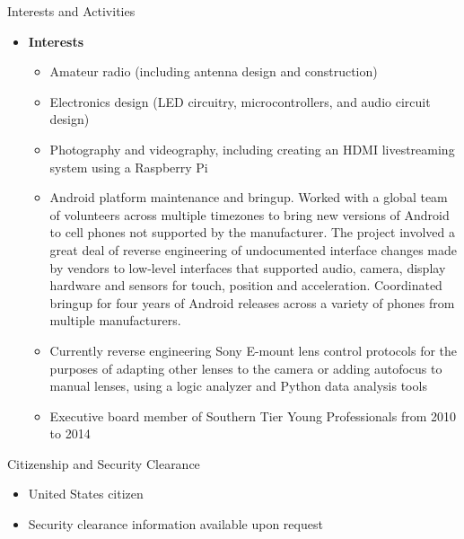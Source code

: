 \documentclass[10pt,oneside]{article}
\newenvironment{ressection}[1]{
	\vspace{4pt}
	{\Large#1}
	\begin{itemize}
	\vspace{3pt}
}{
	\end{itemize}
}
\newcommand{\resitem}[1]{
	\vspace{-4pt}
	\item \begin{flushleft} #1 \end{flushleft}
}
\newcommand{\ressubitem}[1]{
	\vspace{-1pt}
	\item \begin{flushleft} #1 \end{flushleft}
}
\newenvironment{reslist}[1]{
	\resitem{\textbf{#1}}
	\vspace{-5pt}
	\begin{itemize}
}{
	\end{itemize}
}
\newenvironment{ressection}[1]{
	\vspace{4pt}
	{\fontfamily{phv}\selectfont\Large#1}
	\begin{itemize}
	\vspace{3pt}
}{
	\end{itemize}
}
\newcommand{\resitem}[1]{
	\vspace{-4pt}
	\item \begin{flushleft} #1 \end{flushleft}
}
\newcommand{\ressubitem}[1]{
	\vspace{-1pt}
	\item \begin{flushleft} #1 \end{flushleft}
}
\newenvironment{reslist}[1]{
	\resitem{\textbf{#1}}
	\vspace{-5pt}
	\begin{itemize}
}{
	\end{itemize}
}
\begin{document}
\begin{ressection}{Interests and Activities}
	\begin{reslist}{Interests}
		\ressubitem{Amateur radio (including antenna design and construction)}
		\ressubitem{Electronics design (LED circuitry, microcontrollers, and audio circuit design)}
		\ressubitem{Photography and videography, including creating an HDMI livestreaming system using a Raspberry Pi}
	        \ressubitem{Android platform maintenance and bringup.  Worked with a global team of volunteers across multiple timezones to bring new versions of Android to cell phones not supported by the manufacturer.  The project involved a great deal of reverse engineering of undocumented interface changes made by vendors to low-level interfaces that supported audio, camera, display hardware and sensors for touch, position and acceleration.  Coordinated bringup for four years of Android releases across a variety of phones from multiple manufacturers.}
                \ressubitem{Currently reverse engineering Sony E-mount lens control protocols for the purposes of adapting other lenses to the camera or adding autofocus to manual lenses, using a logic analyzer and Python data analysis tools}
		\ressubitem{Executive board member of Southern Tier Young Professionals from 2010 to 2014}
	\end{reslist}
\end{ressection}

\begin{ressection}{Citizenship and Security Clearance}

	\resitem{United States citizen}

	\resitem{Security clearance information available upon request}

\end{ressection}
\end{document}

